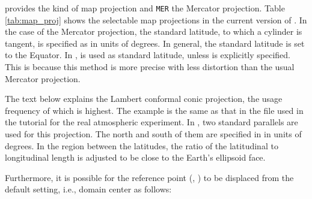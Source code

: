  provides the kind of map projection and \verb|MER| the Mercator projection.
Table \ref{tab:map_proj} shows the selectable map projections in the current version of \scalerm. In the case of the Mercator projection, the standard latitude, to which a cylinder is tangent, is specified as  in units of degrees. In general, the standard latitude is set to the Equator.
In \scalerm,  is used as standard latitude, unless  is explicitly specified. This is because this method is more precise with less distortion than the usual Mercator projection.

The text below explains the Lambert conformal conic projection, the usage frequency of which is highest. The example is the same as that in the file used in the tutorial for the real atmospheric experiment.
In \scalerm, two standard parallels are used for this projection.
The north and south of them are specified in  
in units of degrees.
In the region between the latitudes, the ratio of the latitudinal to longitudinal length is adjusted to be close to the Earth’s ellipsoid face.


Furthermore, it is possible for the reference point (, ) to be displaced from the default setting, i.e., domain center as follows:


